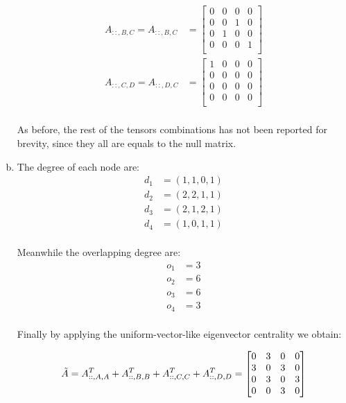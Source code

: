 \documentclass{article}
\begin{document}
\begin{enumerate}[a)]
\begin{align*}
            A_{::,B,C} = A_{::,B,C}&= 
            \begin{bmatrix}
            0 & 0 & 0 & 0 \\
            0 & 0 & 1 & 0 \\
            0 & 1 & 0 & 0 \\
            0 & 0 & 0 & 1 \\
            \end{bmatrix}\\
            A_{::,C,D} = A_{::,D,C} &= 
            \begin{bmatrix}
            1 & 0 & 0 & 0 \\
            0 & 0 & 0 & 0 \\
            0 & 0 & 0 & 0 \\
            0 & 0 & 0 & 0 \\
            \end{bmatrix}\\
    \end{align*}
    
    \noindent As before, the rest of the tensors combinations has not been reported for brevity, since they all are equals to the null matrix.
    
    \item The degree of each node are:
    \begin{align*}
        d_{1} &= (1,1,0,1) \\
        d_{2} &= (2,2,1,1) \\
        d_{3} &= (2,1,2,1) \\
        d_{4} &= (1,0,1,1) \\
    \end{align*}
    
    \par\noindent Meanwhile the overlapping degree are:
    \begin{align*}
        o_{1} &= 3 \\
        o_{2} &= 6 \\
        o_{3} &= 6 \\
        o_{4} &= 3 \\
    \end{align*}
    
    \par\noindent Finally by applying the uniform-vector-like eigenvector centrality we obtain:
    
    \begin{align*}
    \Tilde{A} = A_{::,A,A}^{T} + A_{::,B,B}^{T} + A_{::,C,C}^{T} + A_{::,D,D}^{T} =
        \begin{bmatrix}
            0 & 3 & 0 & 0 \\
            3 & 0 & 3 & 0 \\
            0 & 3 & 0 & 3 \\
            0 & 0 & 3 & 0 \\
        \end{bmatrix}\\
    \end{align*}
    

\end{enumerate}
\end{document}
